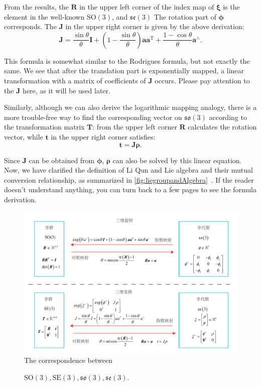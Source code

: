 From the results, the $\bm{R}$ in the upper left corner of the index map of $\boldsymbol{\xi}$ is the element in the well-known $\mathrm{SO}(3)$, and $\mathfrak{se }(3)$ The rotation part of $\boldsymbol{\phi}$ corresponds. The $\bm{J}$ in the upper right corner is given by the above derivation:
\begin{equation}
\label{eq:lieAlgebraJacobian}
\bm{J} = \frac{{\sin \theta }}{\theta } \bm{I} + \left( {1 - \frac{{\sin \theta }}{\theta }} \right) \bm{a} { \bm{a}^\mathrm{T}} + \frac{{1 - \cos \theta }}{\theta }{ \bm{a}^ \wedge }.
\end{equation}

This formula is somewhat similar to the Rodrigues formula, but not exactly the same. We see that after the translation part is exponentially mapped, a linear transformation with a matrix of coefficients of $\bm{J}$ occurs. Please pay attention to the $\bm{J}$ here, as it will be used later.

Similarly, although we can also derive the logarithmic mapping analogy, there is a more trouble-free way to find the corresponding vector on $\mathfrak{so}(3)$ according to the transformation matrix $\bm{T}$: from the upper left corner $\bm{R}$ calculates the rotation vector, while $\bm{t}$ in the upper right corner satisfies:
\begin{equation}
	\bm{t} = \bm{J} \boldsymbol{\rho}.
\end{equation}

Since $\bm{J}$ can be obtained from $\boldsymbol{\phi}$, $\boldsymbol{\rho}$ can also be solved by this linear equation. Now, we have clarified the definition of Li Qun and Lie algebra and their mutual conversion relationship, as summarized in \autoref{fig:liegroupandAlgebra}~. If the reader doesn't understand anything, you can turn back to a few pages to see the formula derivation.

\begin{figure}[!ht]
	\centering
	\includegraphics[width=1.0\textwidth]{chapter04/lieGroup/liegroupandAlgebra.pdf}
	The correspondence between \caption{$\mathrm{SO}(3), \mathrm{SE}(3), \mathfrak{so}(3), \mathfrak{se}(3)$. }
	\label{fig:liegroupandAlgebra}
\end{figure}

\clearpage